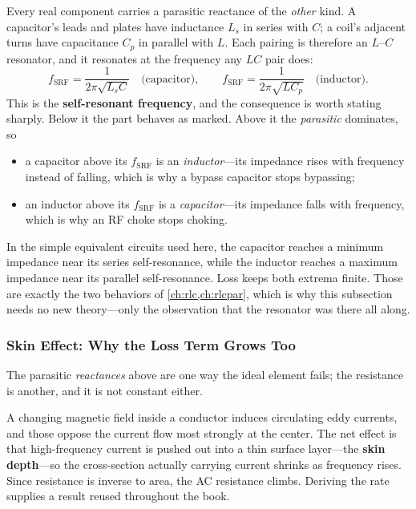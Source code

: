 Every real component carries a parasitic reactance of the \emph{other} kind. A
capacitor's leads and plates have inductance \(L_s\) in series with \(C\); a coil's
adjacent turns have capacitance \(C_p\) in parallel with \(L\). Each pairing is
therefore an \(L\)--\(C\) resonator, and it resonates at the frequency any \(LC\)
pair does:
\[
f_{\mathrm{SRF}}=\frac{1}{2\pi\sqrt{L_sC}}
\quad\text{(capacitor)},
\qquad
f_{\mathrm{SRF}}=\frac{1}{2\pi\sqrt{LC_p}}
\quad\text{(inductor)} .
\]
This is the \textbf{self-resonant frequency}, and the consequence is worth stating
sharply. Below it the part behaves as marked. Above it the \emph{parasitic}
dominates, so
\begin{itemize}
\item a capacitor above its \(f_{\mathrm{SRF}}\) is an \emph{inductor}---its
impedance rises with frequency instead of falling, which is why a bypass capacitor
stops bypassing;
\item an inductor above its \(f_{\mathrm{SRF}}\) is a \emph{capacitor}---its
impedance falls with frequency, which is why an RF choke stops choking.
\end{itemize}
\cite[pp.~5--9]{bowick2008rfcircuit}
In the simple equivalent circuits used here, the capacitor reaches a minimum
impedance near its series self-resonance, while the inductor reaches a maximum
impedance near its parallel self-resonance. Loss keeps both extrema finite. Those are exactly the
two behaviors of \cref{ch:rlc,ch:rlcpar}, which is why this subsection needs no new
theory---only the observation that the resonator was there all along.

\subsubsection*{Skin Effect: Why the Loss Term Grows Too}
The parasitic \emph{reactances} above are one way the ideal element fails; the
resistance is another, and it is not constant either.

A changing magnetic field inside a conductor induces circulating eddy currents,
and those oppose the current flow most strongly at the center. The net effect is
that high-frequency current is pushed out into a thin surface layer---the
\textbf{skin depth}---so the cross-section actually carrying current shrinks as
frequency rises. Since resistance is inverse to area, the AC resistance climbs.
Deriving the rate supplies a result reused throughout the book.

